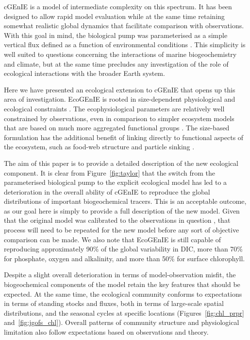 \documentclass[gmd, manuscript]{copernicus}
\begin{document}
{cGEnIE is a model of intermediate complexity on this spectrum. It has been designed to allow rapid model evaluation while at the same time retaining somewhat realistic global dynamics that facilitate comparison with observations. With this goal in mind, the biological pump was parameterised as a simple vertical flux defined as a function of environmental conditions \citep{Ridgwell:2007}. This simplicity is well suited to questions concerning the interactions of marine biogeochemistry and climate, but at the same time precludes any investigation of the role of ecological interactions with the broader Earth system.

Here we have presented an ecological extension to cGEnIE that opens up this area of investigation. EcoGEnIE is rooted in size-dependent physiological and ecological constraints \citep{Ward:2012}. The ecophysiological parameters are relatively well constrained by observations, even in comparison to simpler ecosystem models that are based on much more aggregated functional groups \citep{Anderson:2005,Litchman:2007}. The size-based formulation has the additional benefit of linking directly to functional aspects of the ecosystem, such as food-web structure and particle sinking \citep{Ward:2016}. 

The aim of this paper is to provide a detailed description of the new ecological component. It is clear from Figure~\ref{fig:taylor} that the switch from the parameterised biological pump to the explicit ecological model has led to a deterioration in the overall ability of cGEnIE to reproduce the global distributions of important biogeochemical tracers. This is an acceptable outcome, as our goal here is simply to provide a full description of the new model. Given that the original model was calibrated to the observations in question \citep{Ridgwell:2007}, that process will need to be repeated for the new model before any sort of objective comparison can be made. We also note that EcoGEnIE is still capable of reproducing approximately 90\% of the global variability in DIC, more than 70\% for phosphate, oxygen and alkalinity, and more than 50\% for surface chlorophyll.

Despite a slight overall deterioration in terms of model-observation misfit, the biogeochemical components of the model retain the key features that should be expected. At the same time, the ecological community conforms to expectations in terms of standing stocks and fluxes, both in terms of large-scale spatial distributions, and the seasonal cycles at specific locations (Figures~\ref{fig:chl_prpr} and~\ref{fig:jgofs_chl}). Overall patterns of community structure and physiological limitation also follow expectations based on observations and theory. 

}
\end{document}
